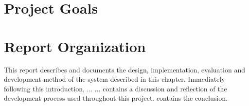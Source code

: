 \section{Project Goals}

\section{Report Organization}
This report describes and documents the design, implementation, evaluation and development method of the system described in this chapter. Immediately following this introduction,  ... \dummy ...  contains a discussion and reflection of the development process used throughout this project.  contains the conclusion.